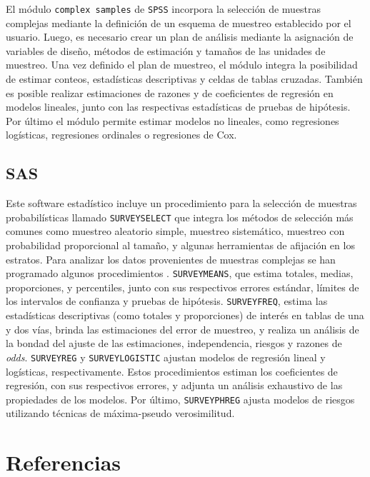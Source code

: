 \documentclass[
  12pt,
  spanish,
]{book}
\begin{document}
El módulo \texttt{complex\ samples} de \texttt{SPSS} \citep{IBM_2017} incorpora la selección de muestras complejas mediante la definición de un esquema de muestreo establecido por el usuario. Luego, es necesario crear un plan de análisis mediante la asignación de variables de diseño, métodos de estimación y tamaños de las unidades de muestreo. Una vez definido el plan de muestreo, el módulo integra la posibilidad de estimar conteos, estadísticas descriptivas y celdas de tablas cruzadas. También es posible realizar estimaciones de razones y de coeficientes de regresión en modelos lineales, junto con las respectivas estadísticas de pruebas de hipótesis. Por último el módulo permite estimar modelos no lineales, como regresiones logísticas, regresiones ordinales o regresiones de Cox.

\hypertarget{sas}{%
\section{SAS}\label{sas}}

Este software estadístico incluye un procedimiento para la selección de muestras probabilísticas llamado \texttt{SURVEYSELECT} que integra los métodos de selección más comunes como muestreo aleatorio simple, muestreo sistemático, muestreo con probabilidad proporcional al tamaño, y algunas herramientas de afijación en los estratos. Para analizar los datos provenientes de muestras complejas se han programado algunos procedimientos \citep{SAS_2017}. \texttt{SURVEYMEANS}, que estima totales, medias, proporciones, y percentiles, junto con sus respectivos errores estándar, límites de los intervalos de confianza y pruebas de hipótesis. \texttt{SURVEYFREQ}, estima las estadísticas descriptivas (como totales y proporciones) de interés en tablas de una y dos vías, brinda las estimaciones del error de muestreo, y realiza un análisis de la bondad del ajuste de las estimaciones, independencia, riesgos y razones de \emph{odds}. \texttt{SURVEYREG} y \texttt{SURVEYLOGISTIC} ajustan modelos de regresión lineal y logísticas, respectivamente. Estos procedimientos estiman los coeficientes de regresión, con sus respectivos errores, y adjunta un análisis exhaustivo de las propiedades de los modelos. Por último, \texttt{SURVEYPHREG} ajusta modelos de riesgos utilizando técnicas de máxima-pseudo verosimilitud.

\hypertarget{referencias}{%
\chapter*{Referencias}\label{referencias}}

  
\end{document}
